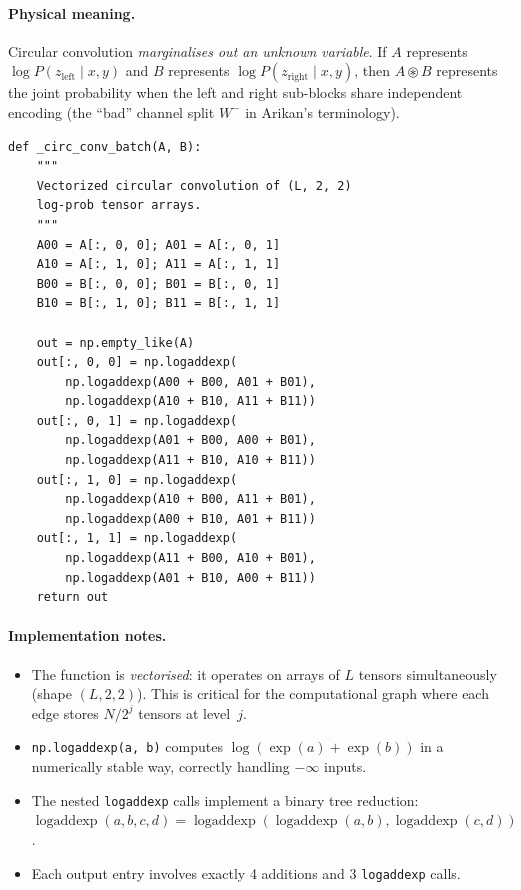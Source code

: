 \documentclass[11pt,a4paper]{article}
\newcommand{\logsumexp}{\operatorname{logaddexp}}
\newcommand{\circconv}{\circledast}
\begin{document}
\paragraph{Physical meaning.} Circular convolution \emph{marginalises out an unknown variable}. If $A$ represents $\log P(z_{\text{left}} \mid x, y)$ and $B$ represents $\log P(z_{\text{right}} \mid x, y)$, then $A \circconv B$ represents the joint probability when the left and right sub-blocks share independent encoding (the ``bad'' channel split $W^-$ in Arikan's terminology).

\begin{lstlisting}[caption={Circular convolution (\texttt{\_circ\_conv\_batch})},label=lst:circ_conv]
def _circ_conv_batch(A, B):
    """
    Vectorized circular convolution of (L, 2, 2)
    log-prob tensor arrays.
    """
    A00 = A[:, 0, 0]; A01 = A[:, 0, 1]
    A10 = A[:, 1, 0]; A11 = A[:, 1, 1]
    B00 = B[:, 0, 0]; B01 = B[:, 0, 1]
    B10 = B[:, 1, 0]; B11 = B[:, 1, 1]

    out = np.empty_like(A)
    out[:, 0, 0] = np.logaddexp(
        np.logaddexp(A00 + B00, A01 + B01),
        np.logaddexp(A10 + B10, A11 + B11))
    out[:, 0, 1] = np.logaddexp(
        np.logaddexp(A01 + B00, A00 + B01),
        np.logaddexp(A11 + B10, A10 + B11))
    out[:, 1, 0] = np.logaddexp(
        np.logaddexp(A10 + B00, A11 + B01),
        np.logaddexp(A00 + B10, A01 + B11))
    out[:, 1, 1] = np.logaddexp(
        np.logaddexp(A11 + B00, A10 + B01),
        np.logaddexp(A01 + B10, A00 + B11))
    return out
\end{lstlisting}

\paragraph{Implementation notes.}
\begin{itemize}
    \item The function is \emph{vectorised}: it operates on arrays of $L$ tensors simultaneously (shape $(L, 2, 2)$). This is critical for the computational graph where each edge stores $N / 2^j$ tensors at level~$j$.
    \item \texttt{np.logaddexp(a, b)} computes $\log(\exp(a) + \exp(b))$ in a numerically stable way, correctly handling $-\infty$ inputs.
    \item The nested \texttt{logaddexp} calls implement a binary tree reduction: $\logsumexp(a, b, c, d) = \logsumexp(\logsumexp(a, b), \logsumexp(c, d))$.
    \item Each output entry involves exactly 4 additions and 3 \texttt{logaddexp} calls.
\end{itemize}
\end{document}
